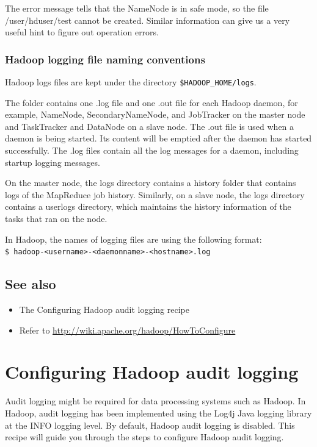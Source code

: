 The error message tells that the NameNode is in safe mode, so the file /user/hduser/test cannot be created. Similar information can give us a very useful hint to figure out operation errors.

\subsubsection*{Hadoop logging file naming conventions}
Hadoop logs files are kept under the directory \verb|$HADOOP_HOME/logs|. 

The folder contains one .log file and one .out file for each Hadoop daemon, for example, NameNode, SecondaryNameNode, and JobTracker on the master node and TaskTracker and DataNode on a slave node. The .out file is used when a daemon is being started. Its content will be emptied after the daemon has started successfully. The .log files contain all the log messages for a daemon, including startup logging messages.

On the master node, the logs directory contains a history folder that contains logs of the MapReduce job history. Similarly, on a slave node, the logs directory contains a userlogs directory, which maintains the history information of the tasks that ran on the node.

In Hadoop, the names of logging files are using the following format: \\
\verb|$ hadoop-<username>-<daemonname>-<hostname>.log |

\subsection*{See also}
\begin{itemize}
  \item The Configuring Hadoop audit logging recipe
  \item Refer to \url{http://wiki.apache.org/hadoop/HowToConfigure}
\end{itemize}

\section{Configuring Hadoop audit logging}
Audit logging might be required for data processing systems such as Hadoop. In Hadoop, audit logging has been implemented using the Log4j Java logging library at the INFO logging level. By default, Hadoop audit logging is disabled. This recipe will guide you through the steps to configure Hadoop audit logging.

